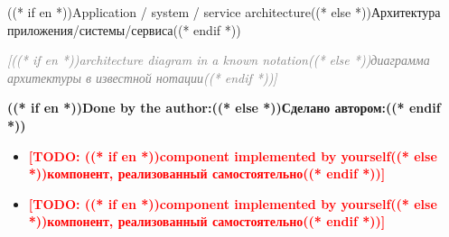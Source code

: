 \documentclass[aspectratio=169, 14pt]{beamer}
\newcommand{\todo}[1]{\textcolor{red}{\textbf{[TODO: #1]}}}
\begin{document}
\begin{frame}{((* if en *))Application / system / service architecture((* else *))Архитектура приложения/системы/сервиса((* endif *))}
  \begin{center}
    \textcolor{gray}{\itshape [((* if en *))architecture diagram in a known notation((* else *))диаграмма архитектуры в известной нотации((* endif *))]}
  \end{center}

  \vspace{0.3em}
  {\color{hseblue}\textbf{((* if en *))Done by the author:((* else *))Сделано автором:((* endif *))}}
  \begin{itemize}
    \item \todo{((* if en *))component implemented by yourself((* else *))компонент, реализованный самостоятельно((* endif *))}
    \item \todo{((* if en *))component implemented by yourself((* else *))компонент, реализованный самостоятельно((* endif *))}
  \end{itemize}
\end{frame}
\end{document}
